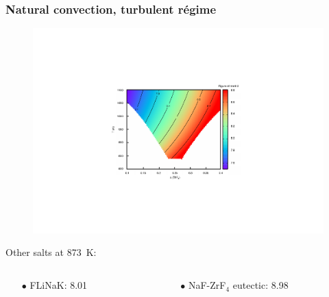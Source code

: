 \documentclass{beamer}
\begin{document}
\begin{frame}
   \frametitle{Natural convection, turbulent r\'egime}
   \begin{figure}
   \includegraphics[width=.6\textwidth]{merit2}
   \end{figure}

  Other salts at 873~K:
    \begin{columns}
      \begin{column}{6cm}
        \begin{itemize}
           \item[$\bullet$] FLiNaK: 8.01 
        \end{itemize}
      \end{column}
      \begin{column}{6cm}
        \begin{itemize}
           \item[$\bullet$] NaF-ZrF$_4$ eutectic: 8.98
        \end{itemize}
      \end{column}
   \end{columns}
   
\end{frame}
\end{document}
